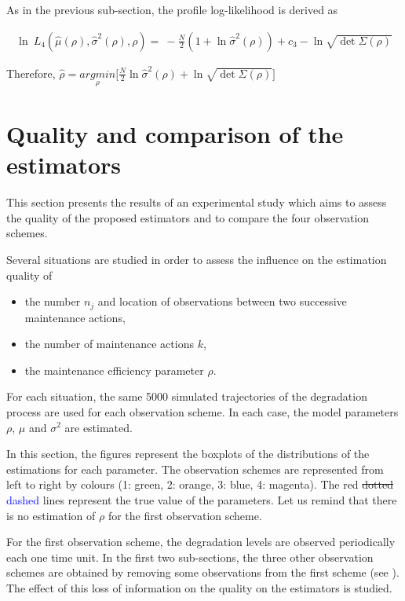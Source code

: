 \noindent As in the previous sub-section, the profile log-likelihood is derived as

\begin{align}
\ln\ L_4\left(\hat\mu(\rho),\hat\sigma^2(\rho),\rho \right)=\ -\frac{N}{2} (1+ \ln \hat\sigma^2(\rho)) + c_3 - \ln \sqrt{\det \Sigma(\rho)} 
\end{align}



\noindent Therefore, $\hat{\rho}=\underset{\rho}{argmin} \Bigg[ \frac{N}{2}  \ln \hat\sigma^2(\rho) + \ln \sqrt{\det \Sigma(\rho)} \Bigg]$



\section{Quality and comparison of the estimators}
\label{section:simu}
This section presents the results of an experimental study
which aims to assess the quality of the proposed estimators and to compare the four observation schemes.

Several situations are studied in order to assess the influence on the estimation quality of
\begin{itemize}
\item the number $n_j$ and location of observations between two successive maintenance actions,
\item the number of maintenance actions $k$,
\item the maintenance efficiency parameter $\rho$.
\end{itemize}

For each situation, the same 5000 simulated trajectories of the degradation process are used for each observation scheme. In each case, the model parameters $\rho$, $\mu$ and $\sigma^2$ are estimated.

In this section, the figures represent the boxplots of the distributions of the estimations for each parameter.
The observation schemes are represented from left to right by colours (1: green, 2: orange, 3: blue, 4: magenta). The red \st{dotted} \textcolor{blue}{dashed} lines represent the true value of the parameters. Let us remind that there is no estimation of $\rho$ for the first observation scheme. 


For the first observation scheme, the degradation levels are observed periodically each one time unit.
In the first two sub-sections, the three other observation schemes are obtained by removing some observations from the first scheme (see ).
The effect of this loss of information on the quality on the estimators is studied. 


